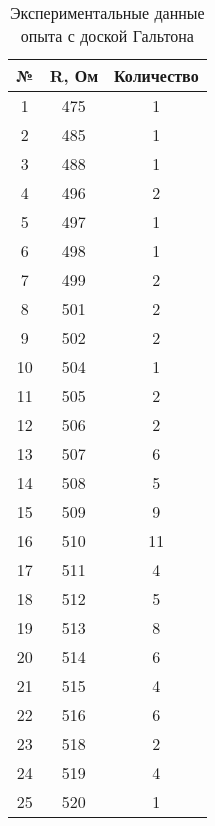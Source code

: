 \begin{center}
	\begin{longtable}{|c|c|c|}
		\caption[Экспериментальные данные опыта с доской Гальтона]{Экспериментальные данные опыта с доской Гальтона} \label{ap:table:3} \\
		\hline
		\multicolumn{1}{|c|}{\textbf{№}} &
		\multicolumn{1}{c|}{\textbf{R, Ом}} & 
		\multicolumn{1}{c|}{\textbf{Количество}} \\ \hline
		\endfirsthead
		
		1   & 475           & 1          \\ \hline
		2   & 485           & 1          \\ \hline
		3   & 488           & 1          \\ \hline
		4   & 496           & 2          \\ \hline
		5   & 497           & 1          \\ \hline
		6   & 498           & 1          \\ \hline
		7   & 499           & 2          \\ \hline
		8   & 501           & 2          \\ \hline
		9   & 502           & 2          \\ \hline
		10  & 504           & 1          \\ \hline
		11  & 505           & 2          \\ \hline
		12  & 506           & 2          \\ \hline
		13  & 507           & 6          \\ \hline
		14  & 508           & 5          \\ \hline
		15  & 509           & 9          \\ \hline
		16  & 510           & 11         \\ \hline
		17  & 511           & 4          \\ \hline
		18  & 512           & 5          \\ \hline
		19  & 513           & 8          \\ \hline
		20  & 514           & 6          \\ \hline
		21  & 515           & 4          \\ \hline
		22  & 516           & 6          \\ \hline
		23  & 518           & 2          \\ \hline
		24  & 519           & 4          \\ \hline
		25  & 520           & 1          \\ \hline

\end{longtable}
\end{center}
